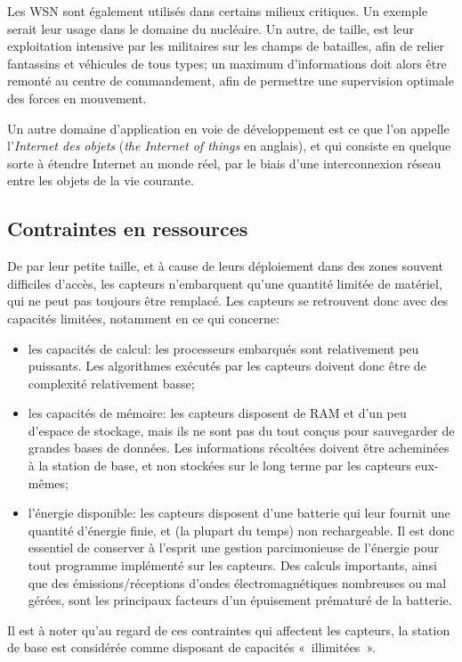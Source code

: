 Les WSN sont également utilisés dans certains milieux critiques.
Un exemple serait leur usage dans le domaine du nucléaire.
Un autre, de taille, est leur exploitation intensive par les militaires sur les champs de batailles, afin de relier fantassins et véhicules de tous types; un maximum d'informations doit alors être remonté au centre de commandement, afin de permettre une supervision optimale des forces en mouvement.

Un autre domaine d'application en voie de développement est ce que l'on appelle l'\textit{Internet des objets} (\textit{the Internet of things} en anglais), et qui consiste en quelque sorte à étendre Internet au monde réel, par le biais d'une interconnexion réseau entre les objets de la vie courante.

    \subsection{Contraintes en ressources}
De par leur petite taille, et à cause de leurs déploiement dans des zones souvent difficiles d'accès, les capteurs n'embarquent qu'une quantité limitée de matériel, qui ne peut pas toujours être remplacé.
Les capteurs se retrouvent donc avec des capacités limitées, notamment en ce qui concerne:
\begin{itemize}
    \item les capacités de calcul: les processeurs embarqués sont relativement peu puissants.
        Les algorithmes exécutés par les capteurs doivent donc être de complexité relativement basse;
    \item les capacités de mémoire: les capteurs disposent de RAM et d'un peu d'espace de stockage, mais ils ne sont pas du tout conçus pour sauvegarder de grandes bases de données.
        Les informations récoltées doivent être acheminées à la station de base, et non stockées sur le long terme par les capteurs eux-mêmes;
    \item l'énergie disponible: les capteurs disposent d'une batterie qui leur fournit une quantité d'énergie finie, et (la plupart du temps) non rechargeable.
        Il est donc essentiel de conserver à l'esprit une gestion parcimonieuse de l'énergie pour tout programme implémenté sur les capteurs.
        Des calculs importants, ainsi que des émissions/réceptions d'ondes électromagnétiques nombreuses ou mal gérées, sont les principaux facteurs d'un épuisement prématuré de la batterie. 
\end{itemize}

Il est à noter qu'au regard de ces contraintes qui affectent les capteurs, la station de base est considérée comme disposant de capacités « illimitées ».

